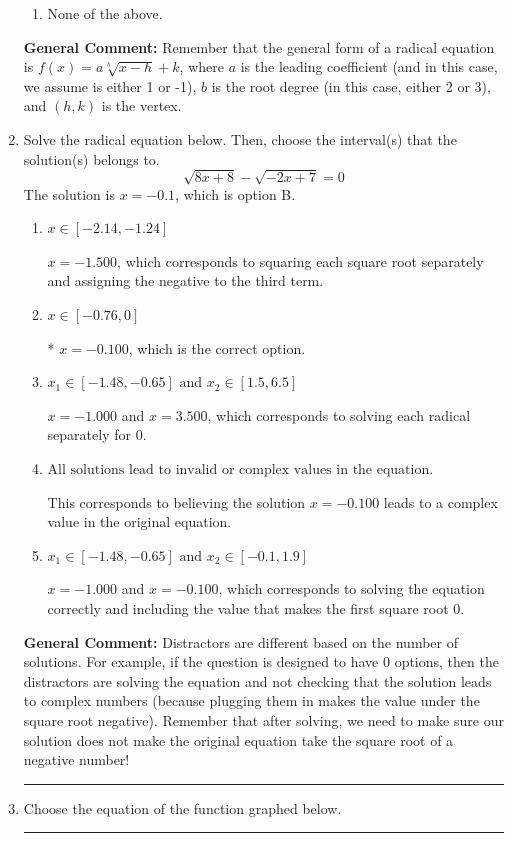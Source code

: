 \documentclass{extbook}[14pt]
\newcommand{\litem}[1]{\item #1

\rule{\textwidth}{0.4pt}}
\begin{document}
\begin{enumerate}
{\begin{enumerate}[label=\Alph*.]
\item None of the above.\end{enumerate}
\textbf{General Comment:} Remember that the general form of a radical equation is $ f(x) = a \sqrt[b]{x - h} + k $, where $a$ is the leading coefficient (and in this case, we assume is either 1 or -1), $b$ is the root degree (in this case, either 2 or 3), and $(h, k)$ is the vertex.
}
\litem{
Solve the radical equation below. Then, choose the interval(s) that the solution(s) belongs to.
\[ \sqrt{8 x + 8} - \sqrt{-2 x + 7} = 0 \]The solution is \( x = -0.1 \), which is option B.\begin{enumerate}[label=\Alph*.]
\item \( x \in [-2.14,-1.24] \)

$x = -1.500$, which corresponds to squaring each square root separately and assigning the negative to the third term.
\item \( x \in [-0.76,0] \)

* $x = -0.100$, which is the correct option.
\item \( x_1 \in [-1.48, -0.65] \text{ and } x_2 \in [1.5,6.5] \)

$x = -1.000$ and $x = 3.500$, which corresponds to solving each radical separately for 0.
\item \( \text{All solutions lead to invalid or complex values in the equation.} \)

This corresponds to believing the solution $x = -0.100$ leads to a complex value in the original equation.
\item \( x_1 \in [-1.48, -0.65] \text{ and } x_2 \in [-0.1,1.9] \)

$x = -1.000$ and $x = -0.100$, which corresponds to solving the equation correctly and including the value that makes the first square root 0.
\end{enumerate}

\textbf{General Comment:} Distractors are different based on the number of solutions. For example, if the question is designed to have 0 options, then the distractors are solving the equation and not checking that the solution leads to complex numbers (because plugging them in makes the value under the square root negative). Remember that after solving, we need to make sure our solution does not make the original equation take the square root of a negative number!
}
\litem{
Choose the equation of the function graphed below.

}
\end{enumerate}
\end{document}
